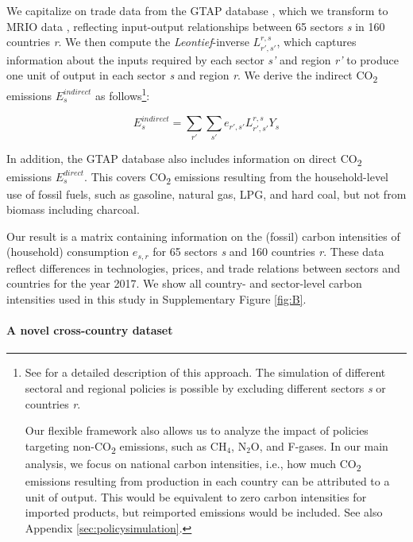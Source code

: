 \documentclass[12pt, a4paper]{article}
\begin{document}
We capitalize on trade data from the GTAP database \autocite[Version 11C, ][]{Aguiar.2022}, which we transform to MRIO data \autocite{Peters.2011}, reflecting input-output relationships between 65 sectors \textit{s} in 160 countries \textit{r}. We then compute the \textit{Leontief}-inverse $L_{r',s'}^{r,s}$, which captures information about the inputs required by each sector \textit{s'} and region \textit{r'} to produce one unit of output in each sector \textit{s} and region \textit{r}. We derive the indirect CO\textsubscript{2} emissions $E_{s}^{indirect}$ as follows\footnote{See \textcite{Missbach.2024, Steckel.2021b,Feindt.2021,VogtSchilb.2019} for a detailed description of this approach. The simulation of different sectoral and regional policies is possible by excluding different sectors \textit{s} or countries \textit{r}. 

Our flexible framework also allows us to analyze the impact of policies targeting non-CO\textsubscript{2} emissions, such as CH$_{4}$, N$_{2}$O, and F-gases. In our main analysis, we focus on national carbon intensities, i.e., how much CO\textsubscript{2} emissions resulting from production in each country can be attributed to a unit of output. This would be equivalent to zero carbon intensities for imported products, but reimported emissions would be included. See also Appendix \ref{sec:policysimulation}.}:

\begin{equation}
    E_{s}^{indirect} = \sum_{r'} \sum_{s'} e_{r',s'} L_{r',s'}^{r,s} Y_{s}
\end{equation}

In addition, the GTAP database also includes information on direct CO\textsubscript{2} emissions $E_{s}^{direct}$. This covers CO\textsubscript{2} emissions resulting from the household-level use of fossil fuels, such as gasoline, natural gas, LPG, and hard coal, but not from biomass including charcoal.

Our result is a matrix containing information on the (fossil) carbon intensities of (household) consumption $e_{s,r}$ for 65 sectors \textit{s} and 160 countries \textit{r}. These data reflect differences in technologies, prices, and trade relations between sectors and countries for the year 2017. We show all country- and sector-level carbon intensities used in this study in Supplementary Figure \ref{fig:B}.

\paragraph{A novel cross-country dataset} 
\end{document}
